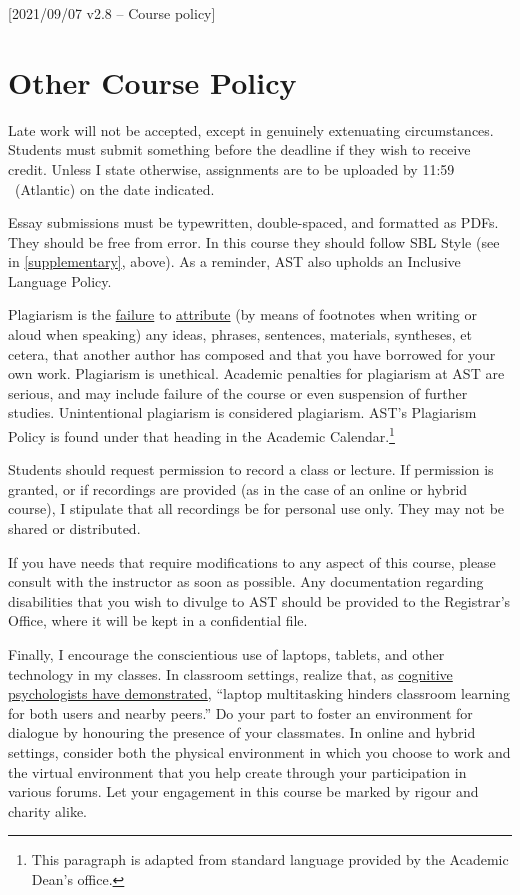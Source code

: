 [2021/09/07 v2.8 -- Course policy]

\section{Other Course Policy}
\label{policy}

Late work will not be accepted, except in genuinely extenuating
circumstances. Students must submit something before the deadline if
they wish to receive credit. Unless I state otherwise, assignments are
to be uploaded by 11:59 \PM\ (Atlantic) on the date indicated.

Essay submissions must be typewritten, double-spaced, and formatted as
PDFs. They should be free from error. In this course they should follow
SBL Style (see \cite{sbl2} in \autoref{supplementary}, above). As a
reminder, AST also upholds an Inclusive Language Policy.

Plagiarism is the
\href{http://www.eerdmans.com/Pages/Item/59043/Commentary-Statement.aspx}{failure}
to \href{https://www.theguardian.com/world/2013/feb/09/german-education-minister-quits-phd-plagiarism}{attribute}
(by means of footnotes when writing or aloud when speaking) any ideas,
phrases, sentences, materials, syntheses, et cetera, that another author
has composed and that you have borrowed for your own work. Plagiarism is
unethical. Academic penalties for plagiarism at AST are serious, and may
include failure of the course or even suspension of further studies.
Unintentional plagiarism is considered plagiarism. AST's Plagiarism
Policy is found under that heading in the Academic
Calendar.\footnote{This paragraph is adapted from standard language
provided by the Academic Dean's office.}

Students should request permission to record a class or lecture. If
permission is granted, or if recordings are provided (as in the case of
an online or hybrid course), I stipulate that all recordings be for
personal use only. They may not be shared or distributed.

If you have needs that require modifications to any aspect of this
course, please consult with the instructor as soon as possible. Any
documentation regarding disabilities that you wish to divulge to AST
should be provided to the Registrar’s Office, where it will be kept in a
confidential file.\footnotemark[1]

Finally, I encourage the conscientious use of laptops, tablets, and
other technology in my classes. In classroom settings, realize that, as
\href{http://dx.doi.org/10.1016/j.compedu.2012.10.003}{cognitive
psychologists have demonstrated}, ``laptop multitasking hinders
classroom learning for both users and nearby peers.'' Do your part to
foster an environment for dialogue by honouring the presence of your
classmates. In online and hybrid settings, consider both the physical
environment in which you choose to work and the virtual environment that
you help create through your participation in various forums. Let your
engagement in this course be marked by rigour and charity alike.
